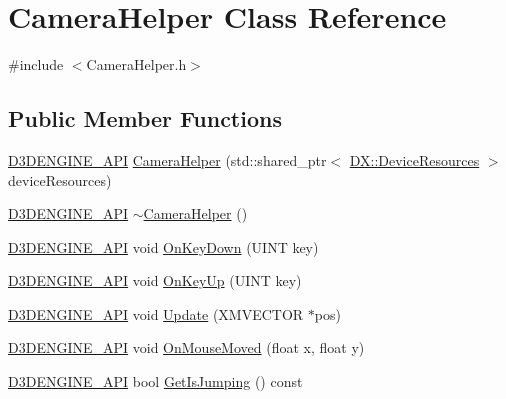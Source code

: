\hypertarget{class_camera_helper}{}\section{Camera\+Helper Class Reference}
\label{class_camera_helper}


{\ttfamily \#include $<$Camera\+Helper.\+h$>$}

\subsection*{Public Member Functions}
\begin{DoxyCompactItemize}
\item 
\mbox{\hyperlink{stdafx_8h_a8ee2d990c5dfba7794dd2b60741d7722}{D3\+D\+E\+N\+G\+I\+N\+E\+\_\+\+A\+PI}} \mbox{\hyperlink{class_camera_helper_a401e32c823d85e9dedeebfd67318e557}{Camera\+Helper}} (std\+::shared\+\_\+ptr$<$ \mbox{\hyperlink{class_d_x_1_1_device_resources}{D\+X\+::\+Device\+Resources}} $>$ device\+Resources)
\item 
\mbox{\hyperlink{stdafx_8h_a8ee2d990c5dfba7794dd2b60741d7722}{D3\+D\+E\+N\+G\+I\+N\+E\+\_\+\+A\+PI}} \mbox{\hyperlink{class_camera_helper_af339b23a92498ca44946c589a7004837}{$\sim$\+Camera\+Helper}} ()
\item 
\mbox{\hyperlink{stdafx_8h_a8ee2d990c5dfba7794dd2b60741d7722}{D3\+D\+E\+N\+G\+I\+N\+E\+\_\+\+A\+PI}} void \mbox{\hyperlink{class_camera_helper_ac9033557a8988c86d0daf3aab1bbfa7f}{On\+Key\+Down}} (U\+I\+NT key)
\item 
\mbox{\hyperlink{stdafx_8h_a8ee2d990c5dfba7794dd2b60741d7722}{D3\+D\+E\+N\+G\+I\+N\+E\+\_\+\+A\+PI}} void \mbox{\hyperlink{class_camera_helper_ab7a651ac749461d078779b8c0accd9a7}{On\+Key\+Up}} (U\+I\+NT key)
\item 
\mbox{\hyperlink{stdafx_8h_a8ee2d990c5dfba7794dd2b60741d7722}{D3\+D\+E\+N\+G\+I\+N\+E\+\_\+\+A\+PI}} void \mbox{\hyperlink{class_camera_helper_a0b9c762c778086dd01d90a25b7ea2989}{Update}} (X\+M\+V\+E\+C\+T\+OR $\ast$pos)
\item 
\mbox{\hyperlink{stdafx_8h_a8ee2d990c5dfba7794dd2b60741d7722}{D3\+D\+E\+N\+G\+I\+N\+E\+\_\+\+A\+PI}} void \mbox{\hyperlink{class_camera_helper_add97d2d08199687ac37111773001bb10}{On\+Mouse\+Moved}} (float x, float y)
\item 
\mbox{\hyperlink{stdafx_8h_a8ee2d990c5dfba7794dd2b60741d7722}{D3\+D\+E\+N\+G\+I\+N\+E\+\_\+\+A\+PI}} bool \mbox{\hyperlink{class_camera_helper_a1801645e4919706fe53c2d8bc2683933}{Get\+Is\+Jumping}} () const

\end{DoxyCompactItemize}
